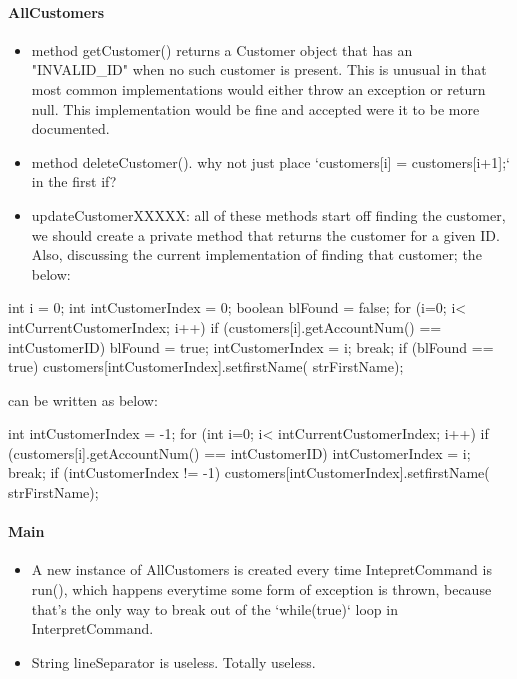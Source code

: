 \paragraph{AllCustomers}
\begin{itemize}
    \item method getCustomer() returns a Customer object that has an "INVALID\_ID" when no such customer is present. This is unusual in that most common implementations would either throw an exception or return null. This implementation would be fine and accepted were it to be more documented. 

    \item method deleteCustomer(). why not just place `customers[i] = customers[i+1];` in the first if? 

    \item updateCustomerXXXXX: all of these methods start off finding the customer, we should create a private method that returns the customer for a given ID. Also, discussing the current implementation of finding that customer; the below: 
\end{itemize}

\begin{javacode}
int i = 0;
int intCustomerIndex = 0;
boolean blFound = false;
for (i=0; i< intCurrentCustomerIndex; i++) {
    if (customers[i].getAccountNum() == intCustomerID) {
        blFound = true;
        intCustomerIndex = i;
        break;
    }
}
if (blFound == true) {
    customers[intCustomerIndex].setfirstName( strFirstName);
}
\end{javacode}
can be written as below: 
\begin{javacode}
int intCustomerIndex = -1;
for (int i=0; i< intCurrentCustomerIndex; i++) {
    if (customers[i].getAccountNum() == intCustomerID) {
        intCustomerIndex = i;
        break;
    }
}
if (intCustomerIndex != -1) {
    customers[intCustomerIndex].setfirstName( strFirstName);
}
\end{javacode}

\paragraph{Main}
\begin{itemize}
    \item A new instance of AllCustomers is created every time IntepretCommand is run(), which happens everytime some form of exception is thrown, because that's the only way to break out of the `while(true)` loop in InterpretCommand. 
    \item String lineSeparator is useless. Totally useless.
\end{itemize}

